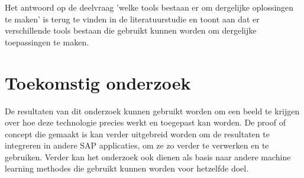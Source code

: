 \documentclass[a0,portrait]{hogent-poster}
\begin{document}
\begin{multicols}{2}
Het antwoord op de deelvraag 'welke tools bestaan er om dergelijke oplossingen te maken' is terug te vinden in de literatuurstudie en toont aan dat er verschillende tools bestaan die gebruikt kunnen worden om dergelijke toepassingen te maken.
\section{Toekomstig onderzoek}

De resultaten van dit onderzoek kunnen gebruikt worden om een beeld te krijgen over hoe deze technologie precies werkt en toegepast kan worden. De proof of concept die gemaakt is kan verder uitgebreid worden om de resultaten te integreren in andere SAP applicaties, om ze zo verder te verwerken en te gebruiken. Verder kan het onderzoek ook dienen als basis naar andere machine learning methodes die gebruikt kunnen worden voor hetzelfde doel. 
\end{multicols}
\end{document}
